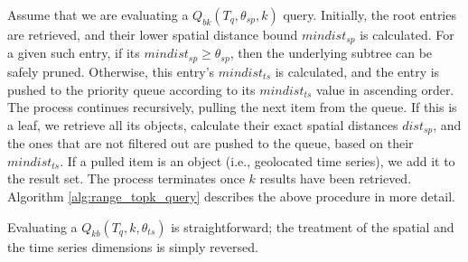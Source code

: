 Assume that we are evaluating a $Q_{bk}(T_q, \theta_{sp}, k)$ query. Initially, the root entries are retrieved, and their lower spatial distance bound $mindist_{sp}$ is calculated. For a given such entry, if its  $mindist_{sp}\geq\theta_{sp}$, then the underlying subtree can be safely pruned. Otherwise, this entry's $mindist_{ts}$ is calculated, and the entry is pushed to the priority queue according to its $mindist_{ts}$ value in ascending order. The process continues recursively, pulling the next item from the queue. If this is a leaf, we retrieve all its objects, calculate their exact spatial distances $dist_{sp}$, and the ones that are not filtered out are pushed to the queue, based on their $mindist_{ts}$. If a pulled item is an object (i.e., geolocated time series), we add it to the result set. The process terminates once $k$ results have been retrieved. Algorithm \ref{alg:range_topk_query} describes the above procedure in more detail. 

Evaluating a $Q_{kb}(T_q, k, \theta_{ts})$ is straightforward; the treatment of the spatial and the time series dimensions is simply reversed.



